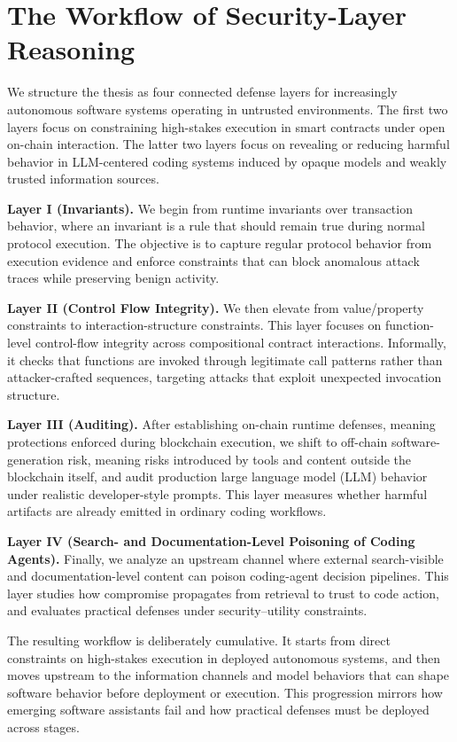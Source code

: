 \section{The Workflow of Security-Layer Reasoning}

We structure the thesis as four connected defense layers for increasingly autonomous software systems operating in untrusted environments.
The first two layers focus on constraining high-stakes execution in smart contracts under open on-chain interaction.
The latter two layers focus on revealing or reducing harmful behavior in LLM-centered coding systems induced by opaque models and weakly trusted information sources.

\noindent \textbf{Layer I (Invariants).}
We begin from runtime invariants over transaction behavior, where an invariant is a rule that should remain true during normal protocol execution.
The objective is to capture regular protocol behavior from execution evidence
and enforce constraints that can block anomalous attack traces while preserving benign activity.

\noindent \textbf{Layer II (Control Flow Integrity).}
We then elevate from value/property constraints to interaction-structure constraints.
This layer focuses on function-level control-flow integrity across compositional contract interactions.
Informally, it checks that functions are invoked through legitimate call patterns rather than attacker-crafted sequences,
targeting attacks that exploit unexpected invocation structure.

\noindent \textbf{Layer III (Auditing).}
After establishing on-chain runtime defenses, meaning protections enforced during blockchain execution,
we shift to off-chain software-generation risk, meaning risks introduced by tools and content outside the blockchain itself, and audit production large language model (LLM) behavior
under realistic developer-style prompts.
This layer measures whether harmful artifacts are already emitted in ordinary coding workflows.

\noindent \textbf{Layer IV (Search- and Documentation-Level Poisoning of Coding Agents).}
Finally, we analyze an upstream channel where external search-visible and documentation-level content
can poison coding-agent decision pipelines.
This layer studies how compromise propagates from retrieval to trust to code action,
and evaluates practical defenses under security--utility constraints.

The resulting workflow is deliberately cumulative.
It starts from direct constraints on high-stakes execution in deployed autonomous systems,
and then moves upstream to the information channels and model behaviors that can shape software behavior before deployment or execution.
This progression mirrors how emerging software assistants fail and how practical defenses must be deployed across stages.
